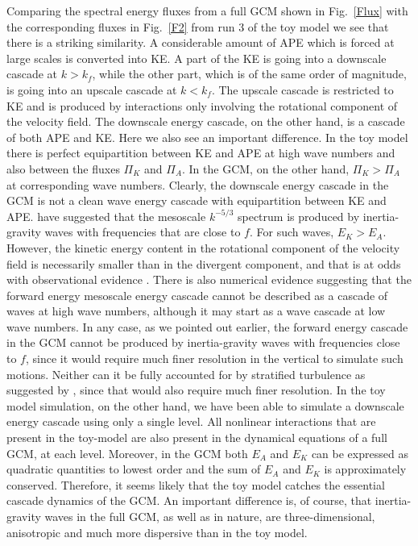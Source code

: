 Comparing the spectral energy fluxes from a full GCM shown in Fig.~\ref{Flux} with the corresponding fluxes in Fig.~\ref{F2} from run 3 of the toy model we see that there is a striking similarity. A considerable amount of APE which is forced at large scales is converted into KE. A part of the KE is going into a downscale cascade at $ k > k_f $, while the other part, which is of the same order of magnitude, is going into an upscale cascade at $ k < k_f $. The upscale cascade is restricted to KE and is produced by interactions only involving the rotational component of the velocity field. The downscale energy cascade, on the other hand, is a cascade of both APE and KE. Here we also see an important difference. In the toy model there is perfect equipartition between KE and APE at high wave numbers and also between the fluxes $ \Pi_K $ and $ \Pi_A $. In the GCM, on the other hand, $ \Pi_K > \Pi_A $ at corresponding wave numbers. Clearly, the downscale energy cascade in the GCM is not a clean wave energy cascade with equipartition between KE and APE. \citet{Callies-Ferrari-Buhler:2014} have suggested that the mesoscale $ k^{-5/3} $ spectrum is produced by inertia-gravity waves with frequencies that are close to $ f $. For such waves, $ E_K > E_A $. However, the kinetic energy content in the rotational component of the velocity field is necessarily smaller than in the divergent component, and that is at odds with observational evidence \citep{Lindborg:2015, QiangLi2017}.  There is also numerical evidence \citep{Deusebio-Augier-Lindborg:2013, Asselin2017} suggesting that the forward energy mesoscale energy cascade cannot be described as a cascade of waves at high wave numbers, although it may start as a wave cascade at low wave numbers. In any case, as we pointed out earlier, the forward energy cascade in the GCM cannot be produced by inertia-gravity waves with frequencies close to $ f $, since it would require much finer resolution in the vertical to simulate such motions. Neither can it be fully accounted for by stratified turbulence as suggested by \citet{Lindborg:2006}, since that would also require much finer resolution. In the toy model simulation, on the other hand, we have been able to simulate a downscale energy cascade using only a single level. All nonlinear interactions that are present in the toy-model are also present in the dynamical equations of a full GCM, at each level. Moreover, in the GCM both $ E_A $   and $ E_K $ can be expressed as quadratic quantities to lowest order and the  sum of $ E_A $ and $ E_K $ is approximately conserved. Therefore, it seems likely that the toy model catches the essential cascade dynamics of the GCM. An important difference is, of course, that  inertia-gravity waves in the full GCM, as well as in nature, are three-dimensional, anisotropic and much more dispersive than in the toy model.

